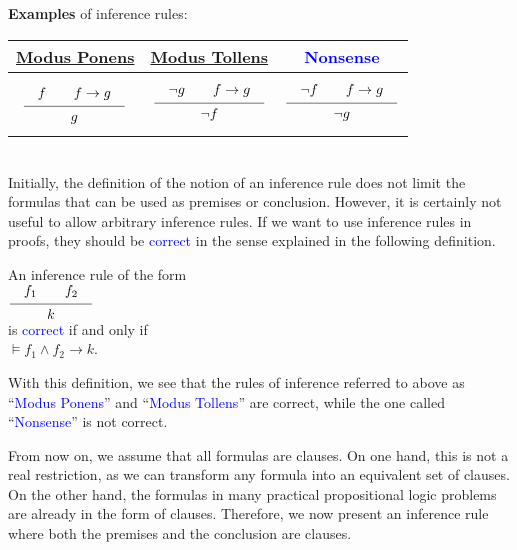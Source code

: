 \noindent
\textbf{Examples} of inference rules:
\\[0.2cm]
\hspace*{1.3cm}            
\begin{tabular}[t]{|c|c|c|}
\hline
\rule{0pt}{15pt} \href{https://en.wikipedia.org/wiki/Modus_ponens}{Modus Ponens} & \href{https://en.wikipedia.org/wiki/Modus_tollens}{Modus Tollens} & \textcolor{blue}{Nonsense} \\[0.3cm]
\hline
$
\rule[-15pt]{0pt}{40pt}\schluss{f \quad\quad f \rightarrow g}{g}$ &
$\schluss{\neg g \quad\quad f \rightarrow g}{\neg f}$ &
$\schluss{\neg f \quad\quad f \rightarrow g}{\neg g}$ \\[0.3cm]
\hline
\end{tabular}
\\[0.3cm]

\noindent
Initially, the definition of the notion of an inference rule does not limit the formulas that can be used as premises
or conclusion. However, it is certainly not useful to allow arbitrary inference rules. If we want to use
inference rules in proofs, they should be \textcolor{blue}{correct} in the sense explained in the following definition.

\begin{Definition}
  An inference rule of the form \\[0.2cm]
  \hspace*{1.3cm} $\schluss{f_1 \qquad f_2}{k}$ \\[0.2cm]
  is \textcolor{blue}{correct} if and only if 
  \\[0.2cm]
  \hspace*{1.3cm}
  $\models f_1 \wedge f_2 \rightarrow k$. \eox
  \\[0.2cm]


\end{Definition}
With this definition, we see that
the rules of inference referred to above as ``\textcolor{blue}{Modus Ponens}'' and ``\textcolor{blue}{Modus Tollens}''
are correct, while the one called ``\textcolor{blue}{Nonsense}''
is not correct.

From now on, we assume that all formulas are clauses. On one hand, this is
not a real restriction, as we can transform any formula into an equivalent set of
clauses. On the other hand, the formulas in many practical propositional
logic problems are already in the form of clauses. Therefore, we now present an inference rule where
both the premises and the conclusion are clauses.
     

